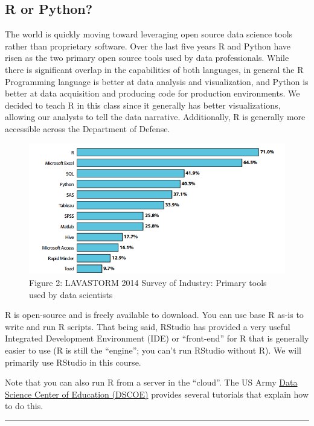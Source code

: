 \documentclass[]{book}
\begin{document}
\subsection{R or Python?}\label{r-or-python}

The world is quickly moving toward leveraging open source data science
tools rather than proprietary software. Over the last five years R and
Python have risen as the two primary open source tools used by data
professionals. While there is significant overlap in the capabilities of
both languages, in general the R Programming language is better at data
analysis and visualization, and Python is better at data acquisition and
producing code for production environments. We decided to teach R in
this class since it generally has better visualizations, allowing our
analysts to tell the data narrative. Additionally, R is generally more
accessible across the Department of Defense.

\begin{figure}[htbp]
\centering
\includegraphics{whyR2.PNG}
\caption{Figure 2: LAVASTORM 2014 Survey of Industry: Primary tools used
by data scientists}
\end{figure}

R is open-source and is freely available to download. You can use base R
as-is to write and run R scripts. That being said, RStudio has provided
a very useful Integrated Development Environment (IDE) or ``front-end''
for R that is generally easier to use (R is still the ``engine''; you
can't run RStudio without R). We will primarily use RStudio in this
course.

Note that you can also run R from a server in the ``cloud''. The US Army
\href{https://dscoe.army.mil/}{Data Science Center of Education (DSCOE)}
provides several tutorials that explain how to do this.

\begin{center}\rule{0.5\linewidth}{\linethickness}\end{center}
\end{document}
